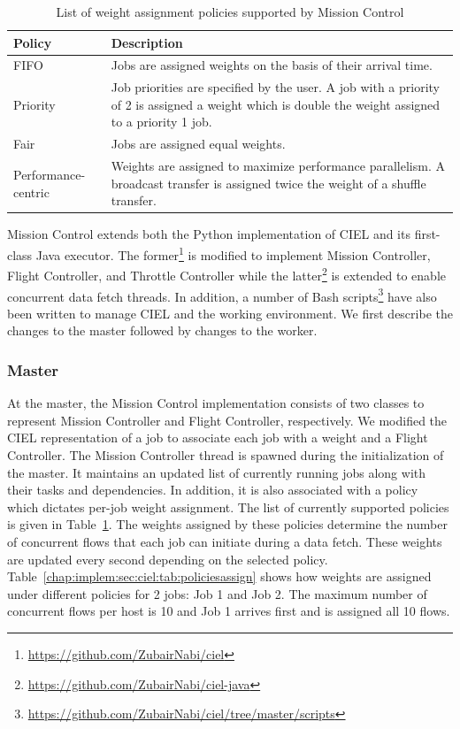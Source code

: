 \documentclass[a4paper,12pt,twoside,openright]{report}
\begin{document}
\begin{table}
  \centering
  \begin{tabularx}{5in}{|X|X|} 
    \hline
	\textbf{Policy} & \textbf{Description} \\ \hline \hline
    FIFO & Jobs are assigned weights on the basis of their arrival time. \\
    \hline 
    Priority & Job priorities are specified by the user. A job with a priority
    of 2 is assigned a weight which is double the weight assigned to a
    priority 1 job.\\ \hline 
    Fair & Jobs are assigned equal weights.\\ \hline 
    Performance-centric & Weights are assigned to maximize performance
    parallelism. A broadcast transfer is assigned twice the weight of a shuffle
    transfer.\\
    \hline
 \end{tabularx} 
  \caption{List of weight assignment policies supported by Mission Control}
  \label{chap:implem:sec:ciel:tab:policies}
\end{table}

Mission Control extends both the Python implementation of CIEL and its
first-class Java executor. The
former\footnote{\url{https://github.com/ZubairNabi/ciel}} is modified to
implement Mission Controller, Flight Controller, and Throttle Controller while
the latter\footnote{\url{https://github.com/ZubairNabi/ciel-java}} is extended
to enable concurrent data fetch threads. In addition, a number of Bash
scripts\footnote{\url{https://github.com/ZubairNabi/ciel/tree/master/scripts}}
have also been written to manage CIEL and the working environment. We first
describe the changes to the master followed by changes to the worker.

\subsubsection{Master}\label{chap:implem:sec:ciel:subsec:master}
At the master, the Mission Control implementation consists of two classes to
represent Mission Controller and Flight Controller, respectively. We modified
the CIEL representation of a job to associate each job with a weight and a
Flight Controller. The Mission Controller thread is spawned during the
initialization of the master. It maintains an updated list of currently running
jobs along with their tasks and dependencies. In addition, it is also associated
with a policy which dictates per-job weight assignment. The list of currently
supported policies is given in Table~\ref{chap:implem:sec:ciel:tab:policies}.
The weights assigned by these policies determine the number of concurrent flows
that each job can initiate during a data fetch. These weights are updated every
second depending on the selected policy.
Table~\ref{chap:implem:sec:ciel:tab:policiesassign} shows how weights are
assigned under different policies for 2 jobs: Job 1 and Job 2. The maximum
number of concurrent flows per host is 10 and Job 1 arrives first and is
assigned all 10 flows.
\end{document}
